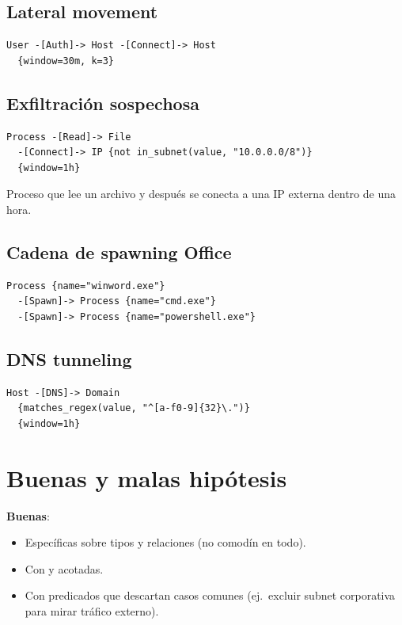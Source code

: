 \subsection{Lateral movement}

\begin{lstlisting}[basicstyle=\ttfamily\small]
User -[Auth]-> Host -[Connect]-> Host
  {window=30m, k=3}
\end{lstlisting}

\subsection{Exfiltración sospechosa}

\begin{lstlisting}[basicstyle=\ttfamily\small]
Process -[Read]-> File
  -[Connect]-> IP {not in_subnet(value, "10.0.0.0/8")}
  {window=1h}
\end{lstlisting}

Proceso que lee un archivo y después se conecta a una IP externa
dentro de una hora.

\subsection{Cadena de spawning Office}

\begin{lstlisting}[basicstyle=\ttfamily\small]
Process {name="winword.exe"}
  -[Spawn]-> Process {name="cmd.exe"}
  -[Spawn]-> Process {name="powershell.exe"}
\end{lstlisting}

\subsection{DNS tunneling}

\begin{lstlisting}[basicstyle=\ttfamily\small]
Host -[DNS]-> Domain
  {matches_regex(value, "^[a-f0-9]{32}\.")}
  {window=1h}
\end{lstlisting}

\section{Buenas y malas hipótesis}

\textbf{Buenas}:

\begin{itemize}
    \item Específicas sobre tipos y relaciones (no comodín en
    todo).
    \item Con  y  acotadas.
    \item Con predicados que descartan casos comunes (ej.\ excluir
    subnet corporativa para mirar tráfico externo).
\end{itemize}

